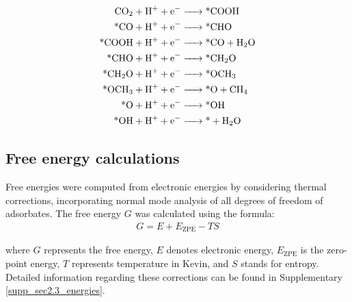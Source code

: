\documentclass[a4paper, 12pt, titlepage]{article}
\begin{document}
    \begin{align}
    \ce{CO2 + H+ + e-          &-> \text{*}COOH}      \label{main_eq1:co2rr1}    \\
    \ce{\text{*}CO + H+ + e-   &-> \text{*}CHO}       \label{main_eq3:co2rr3}    \\
    \ce{\text{*}COOH + H+ + e- &-> \text{*}CO + H2O}  \label{main_eq2:co2rr2}    \\
    \ce{\text{*}CHO + H+ + e-  &-> \text{*}CH2O}      \label{main_eq4:co2rr4}    \\
    \ce{\text{*}CH2O + H+ + e- &-> \text{*}OCH3}      \label{main_eq5:co2rr5}    \\
    \ce{\text{*}OCH3 + H+ + e- &-> \text{*}O + CH4}   \label{main_eq6:co2rr6}    \\
    \ce{\text{*}O + H+ + e-    &-> \text{*}OH}        \label{main_eq7:co2rr7}    \\
    \ce{\text{*}OH + H+ + e-   &-> \text{*} + H2O}    \label{main_eq8:co2rr8}
    \end{align}


    \subsection{Free energy calculations}
    Free energies were computed from electronic energies by considering thermal corrections, incorporating normal mode analysis of all degrees of freedom of adsorbates.
    The free energy $\textit{G}$ was calculated using the formula:
    \begin{align}
    G = E + E_{\text{ZPE}} - TS  \label{main_eq9:free_energy}
    \end{align}

    where $\textit{G}$ represents the free energy, $\textit{E}$ denotes electronic energy, $\textit{E}_{\text{ZPE}}$ is the zero-point energy, $\textit{T}$ represents temperature in Kevin, and $\textit{S}$ stands for entropy.
    Detailed information regarding these corrections can be found in Supplementary \cref{supp_sec2.3_energies}.
\end{document}
